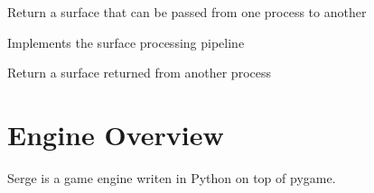 \documentclass[letterpaper,10pt,english]{sphinxmanual}
\begin{document}

\begin{fulllineitems}
\label{blocks:serge.blocks.worker.marshallSurface}
Return a surface that can be passed from one process to another

\end{fulllineitems}


\begin{fulllineitems}
\label{blocks:serge.blocks.worker.pipelineProcessor}
Implements the surface processing pipeline

\end{fulllineitems}


\begin{fulllineitems}
\label{blocks:serge.blocks.worker.unmarshallSurface}
Return a surface returned from another process

\end{fulllineitems}



\chapter{Engine Overview}
\label{engineoverview:engine-overview}\label{engineoverview::doc}
Serge is a game engine writen in Python on top of pygame.
\end{document}
